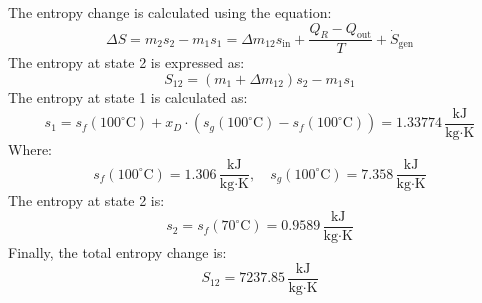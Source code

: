 The entropy change is calculated using the equation:  
\[
\Delta S = m_2 s_2 - m_1 s_1 = \Delta m_{12} s_{\text{in}} + \frac{Q_R - Q_{\text{out}}}{T} + \dot{S}_{\text{gen}}
\]  
The entropy at state 2 is expressed as:  
\[
S_{12} = (m_1 + \Delta m_{12}) s_2 - m_1 s_1
\]  
The entropy at state 1 is calculated as:  
\[
s_1 = s_f(100^\circ\text{C}) + x_D \cdot \left(s_g(100^\circ\text{C}) - s_f(100^\circ\text{C})\right) = 1.33774 \, \frac{\text{kJ}}{\text{kg·K}}
\]  
Where:  
\[
s_f(100^\circ\text{C}) = 1.306 \, \frac{\text{kJ}}{\text{kg·K}}, \quad s_g(100^\circ\text{C}) = 7.358 \, \frac{\text{kJ}}{\text{kg·K}}
\]  
The entropy at state 2 is:  
\[
s_2 = s_f(70^\circ\text{C}) = 0.9589 \, \frac{\text{kJ}}{\text{kg·K}}
\]  
Finally, the total entropy change is:  
\[
S_{12} = 7237.85 \, \frac{\text{kJ}}{\text{kg·K}}
\]